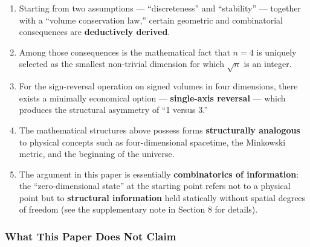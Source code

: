 \documentclass[a4paper,11pt]{article}
\theoremstyle{definition}
\providecommand{\tightlist}{\setlength{\itemsep}{0pt}\setlength{\parskip}{0pt}}
\begin{document}
\begin{enumerate}
\def\labelenumi{\arabic{enumi}.}
\tightlist
\item
  Starting from two assumptions --- ``discreteness'' and ``stability''
  --- together with a ``volume conservation law,'' certain geometric and
  combinatorial consequences are \textbf{deductively derived}.
\item
  Among those consequences is the mathematical fact that
  \textbf{\(n = 4\)} is uniquely selected as the smallest non-trivial
  dimension for which \(\sqrt{n}\) is an integer.
\item
  For the sign-reversal operation on signed volumes in four dimensions,
  there exists a minimally economical option --- \textbf{single-axis
  reversal} --- which produces the structural asymmetry of ``1 versus
  3.''
\item
  The mathematical structures above possess forms \textbf{structurally
  analogous} to physical concepts such as four-dimensional spacetime,
  the Minkowski metric, and the beginning of the universe.
\item
  The argument in this paper is essentially \textbf{combinatorics of
  information}: the ``zero-dimensional state'' at the starting point
  refers not to a physical point but to \textbf{structural information}
  held statically without spatial degrees of freedom (see the
  supplementary note in Section 8 for details).
\end{enumerate}

\subsubsection{What This Paper Does Not
Claim}\label{what-this-paper-does-not-claim}
\end{document}
